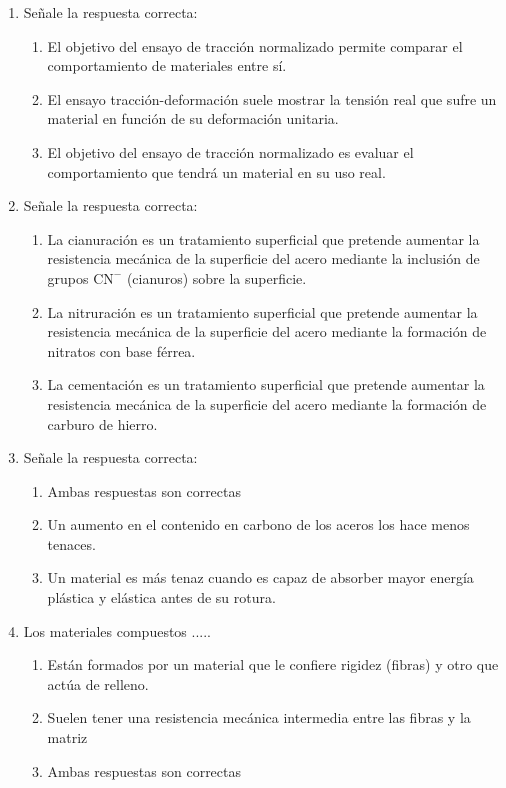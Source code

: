 \begin{enumerate}[label=\textbf{\arabic*.}]
    \item Señale la respuesta correcta:
          \begin{enumerate}[label=\alph*.]
              \item \textcolor{red!85!black}{El objetivo del ensayo de tracción normalizado permite comparar el comportamiento de materiales entre sí.}
              \item El ensayo tracción-deformación suele mostrar la tensión real que sufre un material en función de su deformación unitaria.
              \item El objetivo del ensayo de tracción normalizado es evaluar el comportamiento que tendrá un material en su uso real.
          \end{enumerate}

    \item Señale la respuesta correcta:
          \begin{enumerate}[label=\alph*.]
              \item \textcolor{red!85!black}{La cianuración es un tratamiento superficial que pretende aumentar la resistencia mecánica de la superficie del acero mediante la inclusión de grupos $\text{CN}^-$ (cianuros) sobre la superficie.}
              \item La nitruración es un tratamiento superficial que pretende aumentar la resistencia mecánica de la superficie del acero mediante la formación de nitratos con base férrea.
              \item La cementación es un tratamiento superficial que pretende aumentar la resistencia mecánica de la superficie del acero mediante la formación de carburo de hierro.
          \end{enumerate}

    \item Señale la respuesta correcta:
          \begin{enumerate}[label=\alph*.]
              \item \textcolor{red!85!black}{Ambas respuestas son correctas}
              \item Un aumento en el contenido en carbono de los aceros los hace menos tenaces.
              \item Un material es más tenaz cuando es capaz de absorber mayor energía plástica y elástica antes de su rotura.
          \end{enumerate}

    \item Los materiales compuestos .....
          \begin{enumerate}[label=\alph*.]
              \item Están formados por un material que le confiere rigidez (fibras) y otro que actúa de relleno.
              \item \textcolor{red!85!black}{Suelen tener una resistencia mecánica intermedia entre las fibras y la matriz}
              \item Ambas respuestas son correctas
          \end{enumerate}


\end{enumerate}
